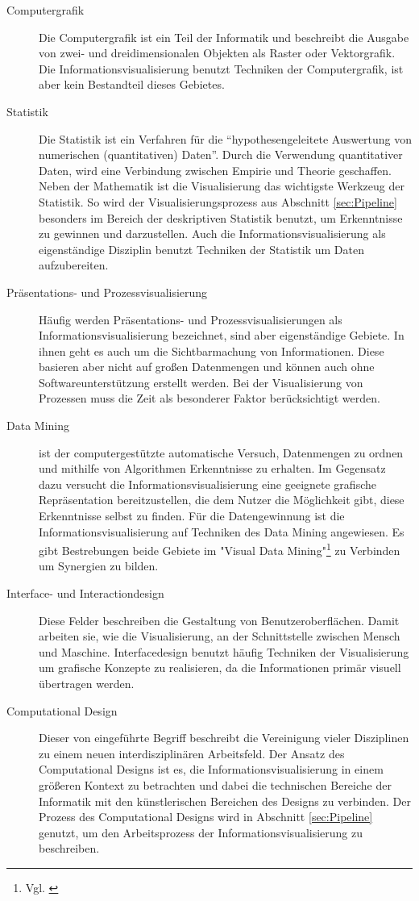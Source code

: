 \documentclass[a4paper, 12pt, DIV=calc, version=first, pdftex, headsepline, footsepline, bibtotocnumbered, liststotocnumbered]{scrreprt}
\begin{document}
\begin{description}
\item[Computergrafik]
Die Computergrafik ist ein Teil der Informatik und beschreibt die Ausgabe von zwei- und dreidimensionalen
Objekten als Raster oder Vektorgrafik. Die Informationsvisualisierung benutzt Techniken der Computergrafik, ist aber kein
Bestandteil dieses Gebietes.
\item[Statistik]
Die Statistik ist ein Verfahren für die "`hypothesengeleitete Auswertung von numerischen (quantitativen)
Daten"'\citep[S.\,23]{Statistik}. Durch die Verwendung quantitativer Daten, wird eine Verbindung zwischen
Empirie und Theorie geschaffen.  Neben der Mathematik ist die Visualisierung das wichtigste
Werkzeug der Statistik. So wird der Visualisierungsprozess aus Abschnitt \ref{sec:Pipeline} besonders
im Bereich der deskriptiven Statistik benutzt, um Erkenntnisse zu gewinnen und darzustellen.
Auch die Informationsvisualisierung als eigenständige Disziplin benutzt Techniken der Statistik um Daten aufzubereiten.
\item[Präsentations- und Prozessvisualisierung]
Häufig werden Präsentations- und Prozessvisualisierungen als Informationsvisualisierung bezeichnet, sind
aber eigenständige Gebiete. In ihnen geht es auch um die Sichtbarmachung von Informationen. Diese basieren aber nicht auf
großen Datenmengen und können auch ohne Softwareunterstützung erstellt werden. Bei der Visualisierung
von Prozessen muss die Zeit als besonderer Faktor berücksichtigt werden.
\item[Data Mining] ist der computergestützte automatische Versuch, Datenmengen zu ordnen und mithilfe
von Algorithmen Erkenntnisse zu erhalten. Im Gegensatz dazu versucht die Informationsvisualisierung eine geeignete grafische Repräsentation
bereitzustellen, die dem Nutzer die Möglichkeit gibt, diese Erkenntnisse selbst zu finden. Für die Datengewinnung
ist die Informationsvisualisierung auf Techniken des Data Mining angewiesen. Es gibt Bestrebungen beide Gebiete 
im "Visual Data Mining"\footnote{Vgl. \citep{Keim}} zu Verbinden um Synergien zu bilden.
\item[Interface- und Interactiondesign]
Diese Felder beschreiben die Gestaltung von Benutzeroberflächen. Damit arbeiten sie, wie die Visualisierung, an
der Schnittstelle zwischen Mensch und Maschine. Interfacedesign benutzt häufig Techniken der Visualisierung
um grafische Konzepte zu realisieren, da die Informationen primär visuell übertragen werden.
\item[Computational Design]
Dieser von \citep{BenFry} eingeführte Begriff beschreibt die Vereinigung vieler Disziplinen zu einem neuen
interdisziplinären Arbeitsfeld. Der Ansatz des Computational Designs ist es, die Informationsvisualisierung in einem größeren
Kontext zu betrachten und dabei die technischen Bereiche der Informatik mit den künstlerischen
Bereichen des Designs zu verbinden. Der Prozess des Computational Designs wird in Abschnitt \ref{sec:Pipeline}
genutzt, um den Arbeitsprozess der Informationsvisualisierung zu beschreiben.
\end{description}
\end{document}
